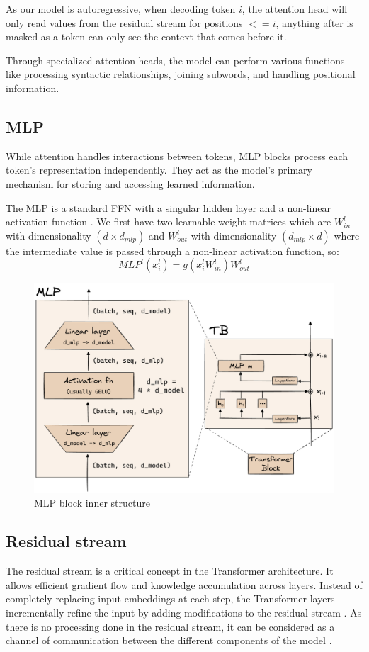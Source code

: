 As our model is autoregressive, when decoding token $i$, the attention head will only read values from the residual stream for positions $<=i$, anything after is masked as a token can only see the context that comes before it.

Through specialized attention heads, the model can perform various functions like processing syntactic relationships, joining subwords, and handling positional information.

\subsection{MLP}
While attention handles interactions between tokens, MLP blocks process each token's representation independently. They act as the model's primary mechanism for storing and accessing learned information.

The MLP is a standard FFN with a singular hidden layer and a non-linear activation function \cite{ferrando_primer_2024}. We first have two learnable weight matrices which are $W^l_{in}$ with dimensionality $(d \times d_{mlp})$ and $W^l_{out}$ with dimensionality $(d_{mlp} \times d)$ where the intermediate value is passed through a non-linear activation function, so:
$$MLP^l(x_i^l) = g(x_i^lW_{in}^l)W_{out}^l$$

\begin{figure}[h]
    \centering
    \includegraphics[width=0.75\linewidth]{MLP.png}
    \caption{MLP block inner structure \cite{colab_transformer_2024}}
\end{figure}

\subsection{Residual stream}
The residual stream is a critical concept in the Transformer architecture. It allows efficient gradient flow and knowledge accumulation across layers. Instead of completely replacing input embeddings at each step, the Transformer layers incrementally refine the input by adding modifications to the residual stream \cite{ferrando_primer_2024}. As there is no processing done in the residual stream, it can be considered as a channel of communication between the different components of the model \cite{nanda_mathematical_nodate}.

